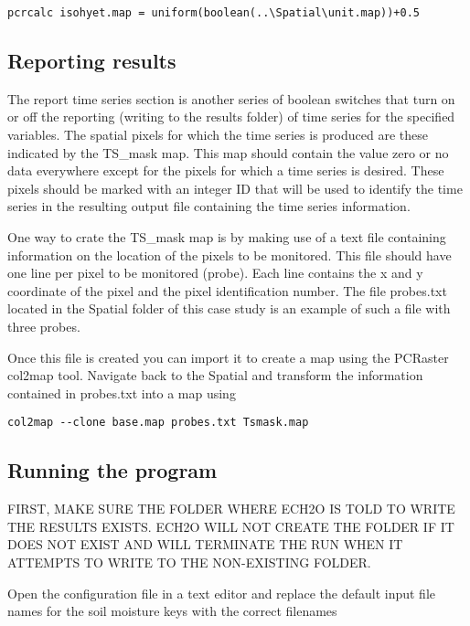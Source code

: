 \begin{verbatim}
pcrcalc isohyet.map = uniform(boolean(..\Spatial\unit.map))+0.5
\end{verbatim} 


\subsection{Reporting results}
 
The report time series section is another series of boolean switches that turn on or off the reporting (writing to the results folder) of time series for the specified variables. The spatial pixels for which the time series is produced are these indicated by the \textsf{TS\_mask} map. This map should contain the value zero or no data everywhere except for the pixels for which a time series is desired. These pixels should be marked with an integer ID that will be used to identify the time series in the resulting output file containing the time series information.   

One way to crate the \textsf{TS\_mask} map is by making use of a text file containing information on the location of the pixels to be monitored. This file should have one line per pixel to be monitored (probe). Each line contains the x and y coordinate of the pixel and the pixel identification number. The file \textsf{probes.txt} located in the \textsf{Spatial} folder of this case study is an example of such a file with three probes. 

Once this file is created you can import it to create a map using the PCRaster \textsf{col2map} tool. Navigate back to the \textsf{Spatial} and transform the information contained in \textsf{probes.txt} into a map using   

\begin{verbatim}
col2map --clone base.map probes.txt Tsmask.map
\end{verbatim} 
 

 
 
\subsection{Running the program}

FIRST, MAKE SURE THE FOLDER WHERE ECH2O IS TOLD TO WRITE THE RESULTS EXISTS. ECH2O WILL NOT CREATE THE FOLDER IF IT DOES NOT EXIST AND WILL TERMINATE THE RUN WHEN IT ATTEMPTS TO WRITE TO THE NON-EXISTING FOLDER.

Open the configuration file in a text editor and replace the default input file names for the soil moisture keys with the correct filenames

